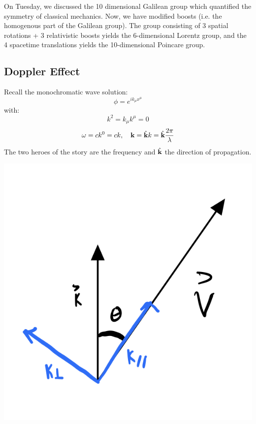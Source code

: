 On Tuesday, we discussed the 10 dimensional Galilean group which quantified the symmetry of classical mechanics. Now, we have modified boosts (i.e. the homogenous part of the Galilean group). The group consisting of 3 spatial rotations + 3 relativistic boosts yields the 6-dimensional Lorentz group, and the 4 spacetime translations yields the 10-dimensional Poincare group.

\subsection{Doppler Effect}
Recall the monochromatic wave solution:
\begin{equation}
    \phi = e^{ik_\mu x^\mu}
\end{equation}
with:
\begin{equation}
    k^2 = k_\mu k^\mu = 0
\end{equation}
\begin{equation}
    \omega = ck^0 = ck, \quad \mathbf{k} = \hat{\mathbf{k}}k = \hat{\mathbf{k}}\frac{2\pi}{\lambda}
\end{equation}
The two heroes of the story are the frequency and $\hat{\mathbf{k}}$ the direction of propagation.

\begin{center}
    \includegraphics[scale=0.35]{Lectures/Images/lec2-wavevectorboost.png}
\end{center}

